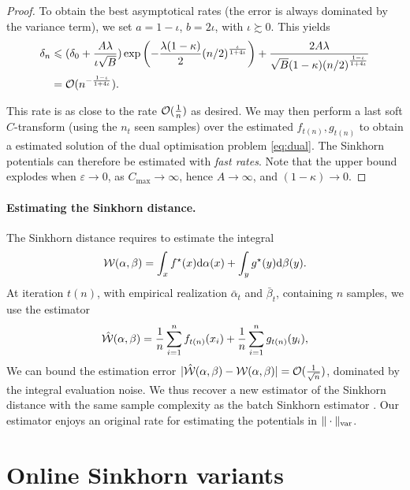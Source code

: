 \begin{proof}
To obtain the best asymptotical rates (the error is always dominated by the variance term), we set $a = 1 - \iota$, $ b = 2 \iota$, with $\iota \succsim 0$. This yields
\begin{align}\label{eq:D_constant}
    \delta_n &\leqslant 
    (\delta_0 + \frac{A \lambda}{\iota \sqrt{B}})
    \exp\left(- \frac{\lambda(1 - \kappa)}{2} {(n/2)}^{\frac{\iota}{1 + 4\iota}}\right)
    + \frac{2 A \lambda}{\sqrt{B}(1 - \kappa) {(n/2)}^{\frac{1 - \iota}{1 + 4\iota}}} \\
    &= \mathcal{O}(n^{-\frac{1 - \iota}{1 + 4 \iota}}). 
\end{align}

This rate is as close to the rate $\mathcal{O}(\frac{1}{n})$ as desired. We may then
perform a last soft $C$-transform (using the $n_t$ seen samples) over the
estimated $f_{t(n)}, g_{t(n)}$ to obtain a estimated solution of the dual
optimisation problem \eqref{eq:dual}. The Sinkhorn potentials can therefore be
estimated with \textit{fast rates}. Note that the upper bound explodes when $\varepsilon
\to 0$, as $C_{\max} \to \infty$, hence $A \to \infty$, and $(1 - \kappa) \to 0$.
\end{proof}

\paragraph{Estimating the Sinkhorn distance.} The Sinkhorn distance requires to estimate the integral
\begin{equation}
    \mathcal{W}(\alpha, \beta) = \int_x f^\star(x) \textrm{d} \alpha(x) + \int_y g^\star(y) \textrm{d} \beta(y).
\end{equation}
At iteration $t(n)$, with empirical realization $\bar \alpha_t$ and $\bar
\beta_t$, containing $n$ samples, we use the estimator
\begin{equation}
    \hat {\mathcal{W}}(\alpha, \beta) = \frac{1}{n} \sum_{i=1}^n f_{t(n)}(x_i) + \frac{1}{n} \sum_{i=1}^n g_{t(n)}(y_i),
\end{equation}
We can bound the estimation error $|\hat {\mathcal{W}}(\alpha, \beta) - \mathcal{W}(\alpha, \beta)
| = \mathcal{O}(\frac{1}{\sqrt{n}})$, dominated by the integral evaluation noise. We
thus recover a new estimator of the Sinkhorn distance with the same sample
complexity as the batch Sinkhorn estimator \citep{2019-Genevay-aistats}. Our
estimator enjoys an original rate for estimating the potentials in $\Vert \cdot
\Vert_{\text{\upshape var}}$.

\pagebreak
\section{Online Sinkhorn variants}

